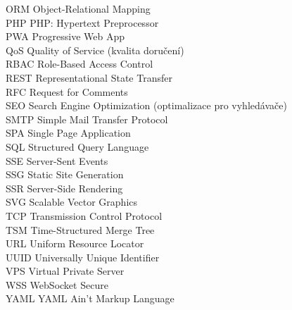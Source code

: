 \begin{tabbing}
ORM \> Object-Relational Mapping \\
PHP \> PHP: Hypertext Preprocessor \\
PWA \> Progressive Web App \\
QoS \> Quality of Service (kvalita doručení) \\
RBAC \> Role-Based Access Control \\
REST \> Representational State Transfer \\
RFC \> Request for Comments \\
SEO \> Search Engine Optimization (optimalizace pro vyhledávače) \\
SMTP \> Simple Mail Transfer Protocol \\
SPA \> Single Page Application \\
SQL \> Structured Query Language \\
SSE \> Server-Sent Events \\
SSG \> Static Site Generation \\
SSR \> Server-Side Rendering \\
SVG \> Scalable Vector Graphics \\
TCP \> Transmission Control Protocol \\
TSM \> Time-Structured Merge Tree \\
URL \> Uniform Resource Locator \\
UUID \> Universally Unique Identifier \\
VPS \> Virtual Private Server \\
WSS \> WebSocket Secure \\
YAML \> YAML Ain't Markup Language \\
\end{tabbing}
